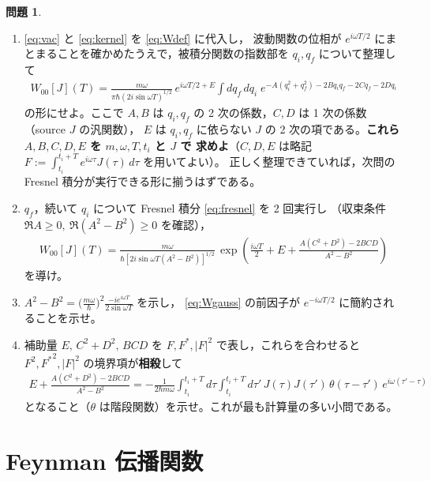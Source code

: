 \documentclass[dvipdfmx, uplatex]{jsarticle}
\theoremstyle{definition}
\newtheorem{prob}{問題}
\begin{document}
\begin{prob}\label{prob:W}
\begin{enumerate}
\item \eqref{eq:vac} と \eqref{eq:kernel} を \eqref{eq:Wdef} に代入し，
波動関数の位相が $e^{i\omega T/2}$ にまとまることを確かめたうえで，被積分関数の指数部を
$q_i,q_f$ について整理して
\begin{align}
    W_{00}[J](T)
    =\frac{m\omega}{\pi\hbar(2i\sin\omega T)^{1/2}}\,
    e^{i\omega T/2+E}
    \int dq_f\,dq_i\;
    e^{-A(q_i^2+q_f^2)-2Bq_iq_f-2Cq_f-2Dq_i}
\label{eq:WABCD}
\end{align}
の形にせよ。ここで $A,B$ は $q_i,q_f$ の 2 次の係数，$C,D$ は 1 次の係数（source $J$ の汎関数），
$E$ は $q_i,q_f$ に依らない $J$ の 2 次の項である。\textbf{これら $A,B,C,D,E$ を $m,\omega,T,t_i$ と $J$ で
求めよ}（$C,D,E$ は略記 $F:=\displaystyle\int_{t_i}^{t_i+T}\! e^{i\omega\tau}J(\tau)\,d\tau$ を用いてよい）。
正しく整理できていれば，次問の Fresnel 積分が実行できる形に揃うはずである。
\item $q_f$，続いて $q_i$ について Fresnel 積分 \eqref{eq:fresnel} を 2 回実行し
（収束条件 $\Re A\ge0,\ \Re(A^2-B^2)\ge0$ を確認），
\begin{align}
    W_{00}[J](T)
    =\frac{m\omega}{\hbar[2i\sin\omega T(A^2-B^2)]^{1/2}}\,
    \exp\!\left(\frac{i\omega T}{2}+E+\frac{A(C^2+D^2)-2BCD}{A^2-B^2}\right)
\label{eq:Wgauss}
\end{align}
を導け。
\item $A^2-B^2=\big(\frac{m\omega}{\hbar}\big)^2\frac{-ie^{i\omega T}}{2\sin\omega T}$ を示し，
\eqref{eq:Wgauss} の前因子が $e^{-i\omega T/2}$ に簡約されることを示せ。
\item 補助量 $E,\,C^2+D^2,\,BCD$ を $F,F^*,|F|^2$ で表し，これらを合わせると
$F^2,{F^*}^2,|F|^2$ の境界項が\textbf{相殺}して
\begin{align}
    E+\frac{A(C^2+D^2)-2BCD}{A^2-B^2}
    =-\frac{1}{2\hbar m\omega}
    \int_{t_i}^{t_i+T}\!\!d\tau\int_{t_i}^{t_i+T}\!\!d\tau'\,
    J(\tau)J(\tau')\,\theta(\tau-\tau')\,e^{i\omega(\tau'-\tau)}
\label{eq:exponent}
\end{align}
となること（$\theta$ は階段関数）を示せ。これが最も計算量の多い小問である。
\end{enumerate}
\end{prob}

\section{Feynman 伝播関数}
\end{document}
